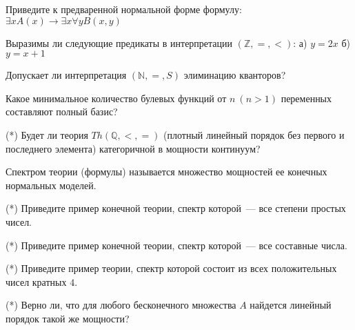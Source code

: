 \setcounter{curtask}{1}


\begin{task}
    Приведите к предваренной нормальной форме формулу:
    $\exists x A(x) \rightarrow \exists x \forall y B(x, y)$
\end{task}

\begin{task}
    Выразимы ли следующие предикаты в интерпретации
    $(\mathbb{Z}, =, <)$:
    а) $y = 2x$
    б) $y = x + 1$
\end{task}

\begin{task}
    Допускает ли интерпретация $(\mathbb{N}, =, S)$ элиминацию
    кванторов?
\end{task}

\begin{task}
    Какое минимальное количество булевых функций от $n~ (n > 1)$
    переменных составляют полный базис?
\end{task}


\breakline

\begin{task}(*)
    Будет ли теория $Th(\mathbb{Q}, <, =)$ (плотный линейный порядок
    без первого и последнего элемента) категоричной в мощности континуум?
\end{task}

Спектром теории (формулы) называется множество мощностей ее конечных нормальных
моделей.

\begin{task}(*)
    Приведите пример конечной теории, спектр которой~--- все степени
    простых чисел.
\end{task}

\begin{task}(*)
    Приведите пример конечной теории, спектр которой~--- все составные
    числа.
\end{task}

\begin{task}(*)
    Приведите пример теории, спектр которой состоит из всех
    положительных чисел кратных $4$.
\end{task}

\begin{task}(*)
    Верно ли, что для любого бесконечного множества $A$ найдется
    линейный порядок такой же мощности?
\end{task}